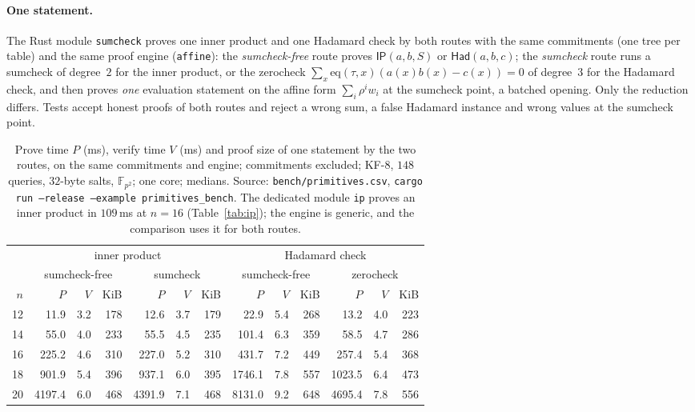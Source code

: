 \documentclass[11pt]{article}
\theoremstyle{definition}
\newcommand{\F}{\mathbb{F}}
\begin{document}
\paragraph{One statement.} The Rust module \texttt{sumcheck} proves one inner product and one Hadamard check by both routes with the same commitments (one tree per table) and the same proof engine (\texttt{affine}): the \emph{sumcheck-free} route proves $\mathsf{IP}(a,b,S)$ or $\mathsf{Had}(a,b,c)$; the \emph{sumcheck} route runs a sumcheck of degree~$2$ for the inner product, or the zerocheck $\sum_x\mathrm{eq}(\tau,x)(a(x)b(x)-c(x))=0$ of degree~$3$ for the Hadamard check, and then proves \emph{one} evaluation statement on the affine form $\sum_i\rho^iw_i$ at the sumcheck point, a batched opening. Only the reduction differs. Tests accept honest proofs of both routes and reject a wrong sum, a false Hadamard instance and wrong values at the sumcheck point.

\begin{table}[h]
\centering\small
\setlength{\tabcolsep}{3.5pt}
\begin{tabular}{r rrr rrr rrr rrr}
\hline
& \multicolumn{6}{c}{inner product} & \multicolumn{6}{c}{Hadamard check}\\
& \multicolumn{3}{c}{sumcheck-free} & \multicolumn{3}{c}{sumcheck} & \multicolumn{3}{c}{sumcheck-free} & \multicolumn{3}{c}{zerocheck}\\
$n$ & $P$ & $V$ & KiB & $P$ & $V$ & KiB & $P$ & $V$ & KiB & $P$ & $V$ & KiB\\
\hline
12 & 11.9 & 3.2 & 178 & 12.6 & 3.7 & 179 & 22.9 & 5.4 & 268 & 13.2 & 4.0 & 223\\
14 & 55.0 & 4.0 & 233 & 55.5 & 4.5 & 235 & 101.4 & 6.3 & 359 & 58.5 & 4.7 & 286\\
16 & 225.2 & 4.6 & 310 & 227.0 & 5.2 & 310 & 431.7 & 7.2 & 449 & 257.4 & 5.4 & 368\\
18 & 901.9 & 5.4 & 396 & 937.1 & 6.0 & 395 & 1746.1 & 7.8 & 557 & 1023.5 & 6.4 & 473\\
20 & 4197.4 & 6.0 & 468 & 4391.9 & 7.1 & 468 & 8131.0 & 9.2 & 648 & 4695.4 & 7.8 & 556\\
\hline
\end{tabular}
\caption{Prove time $P$ (ms), verify time $V$ (ms) and proof size of one statement by the two routes, on the same commitments and engine; commitments excluded; KF-8, $148$ queries, $32$-byte salts, $\F_{p^2}$; one core; medians. Source: \texttt{bench/primitives.csv}, \texttt{cargo run --release --example primitives\_bench}. The dedicated module \texttt{ip} proves an inner product in $109$\,ms at $n=16$ (Table~\ref{tab:ip}); the engine is generic, and the comparison uses it for both routes.}
\end{table}
\end{document}
